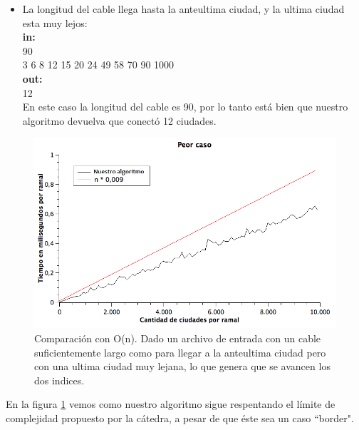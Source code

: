 \begin{itemize}
\item La longitud del cable llega hasta la anteultima ciudad, y la ultima ciudad esta muy lejos:\\
\textbf{in:}\\
90\\
3 6 8 12 15 20 24 49 58 70 90 1000 \\
\textbf{out:}\\
12\\

En este caso la longitud del cable es 90, por lo tanto está bien que nuestro algoritmo devuelva que conectó 12 ciudades.\\
\end{itemize}

\begin{figure}[H]
\begin{center}

  \includegraphics[width=\linewidth]{../graficos/ej1/PeorCaso.png}
  \caption{{\small Comparación con O(n). Dado un archivo de entrada con un cable suficientemente largo como para llegar a la anteultima ciudad pero con una ultima ciudad muy lejana, lo que genera que se avancen los dos indices.}} \label{ej1-tiempo-vs-cant-ciudades-random-long-cable-1}
\endminipage

\end{center}
\end{figure}

En la figura \ref{ej1-tiempo-vs-cant-ciudades-random-long-cable-1} vemos como nuestro algoritmo sigue respentando el límite de complejidad propuesto por la cátedra, a pesar de que éste sea un caso ``border". \\

